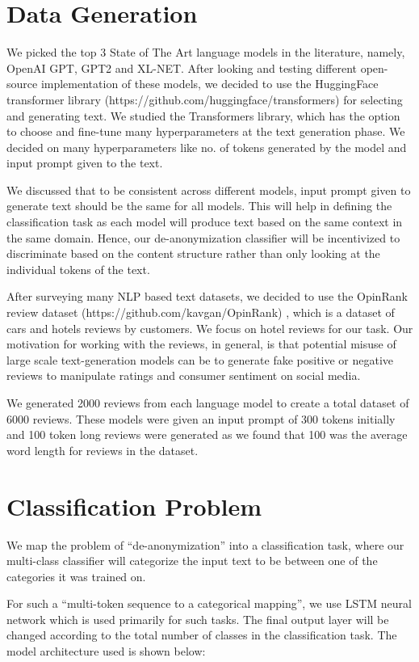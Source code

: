 \documentclass[11pt,letterpaper]{article}
\begin{document}
\section{Data Generation}
We picked the top 3 State of The Art language models in the 
literature, namely, OpenAI GPT, GPT2 and XL-NET. After looking and 
testing different open-source implementation of these models, we 
decided to use the HuggingFace transformer library 
(https://github.com/huggingface/transformers) \cite{Wolf2019HuggingFacesTS} for selecting and 
generating text. We studied the Transformers library, which has the 
option to choose and fine-tune many hyperparameters at the text 
generation phase. We decided on many hyperparameters like no. of tokens 
generated by the model and input prompt given to the text. \par
We discussed that to be consistent across different models, input 
prompt given to generate text should be the same for all models. 
This will help in defining the classification task as each model 
will produce text based on the same context in the same domain. 
Hence, our de-anonymization classifier will be incentivized to 
discriminate based on the content structure rather than only looking 
at the individual tokens of the text. \par
After surveying many NLP based text datasets, we decided to use the 
OpinRank review dataset (https://github.com/kavgan/OpinRank) \cite{ganesan2012opinion}, which is 
a dataset of cars and hotels reviews by customers. We focus on hotel 
reviews for our task. Our motivation for working with the reviews, 
in general, is that potential misuse of large scale text-generation 
models can be to generate fake positive or negative reviews to 
manipulate ratings and consumer sentiment on social media. \par
We generated 2000 reviews from each language model to create a total 
dataset of 6000 reviews. These models were given an input prompt of 
300 tokens initially and 100 token long reviews were generated as we 
found that 100 was the average word length for reviews in the dataset. \par


\clearpage

\section{Classification Problem}
We map the problem of “de-anonymization” into a classification task, 
where our multi-class classifier will categorize the input text to be 
between one of the categories it was trained on. \par
For such a “multi-token sequence to a categorical mapping”, we use 
LSTM neural network which is used primarily for such tasks. The final 
output layer will be changed according to the total number of classes 
in the classification task. The model architecture used is shown below:
\end{document}
